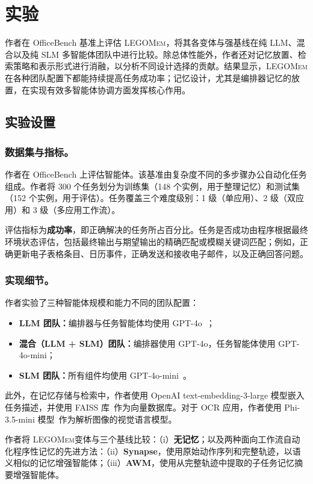 \documentclass[10pt,twocolumn]{article}
\newcommand{\legomem}{\textsc{LEGOMem}}
\begin{document}
\section{实验}

作者在 OfficeBench 基准上评估 \legomem，将其各变体与强基线在纯 LLM、混合以及纯 SLM 多智能体团队中进行比较。除总体性能外，作者还对记忆放置、检索策略和表示形式进行消融，以分析不同设计选择的贡献。结果显示，\legomem 在各种团队配置下都能持续提高任务成功率；记忆设计，尤其是编排器记忆的放置，在实现有效多智能体协调方面发挥核心作用。

\subsection{实验设置}

\subsubsection{数据集与指标。}
作者在 OfficeBench 上评估智能体。该基准由复杂度不同的多步骤办公自动化任务组成。作者将 300 个任务划分为训练集（148 个实例，用于整理记忆）和测试集（152 个实例，用于评估）。任务覆盖三个难度级别：1 级（单应用）、2 级（双应用）和 3 级（多应用工作流）。

评估指标为\textbf{成功率}，即正确解决的任务所占百分比。任务是否成功由程序根据最终环境状态评估，包括最终输出与期望输出的精确匹配或模糊关键词匹配；例如，正确更新电子表格条目、日历事件，正确发送和接收电子邮件，以及正确回答问题。

\subsubsection{实现细节。}
作者实验了三种智能体规模和能力不同的团队配置：
\begin{itemize}
    \item \textbf{LLM 团队：}编排器与任务智能体均使用 GPT-4o~\cite{hurst2024gpt}；
    \item \textbf{混合（LLM + SLM）团队：}编排器使用 GPT-4o，任务智能体使用 GPT-4o-mini；
    \item \textbf{SLM 团队：}所有组件均使用 GPT-4o-mini~\cite{hurst2024gpt}。
\end{itemize}
此外，在记忆存储与检索中，作者使用 OpenAI text-embedding-3-large 模型嵌入任务描述，并使用 FAISS 库~\cite{douze2024faiss}作为向量数据库。对于 OCR 应用，作者使用 Phi-3.5-mini 模型~\cite{abdin2024phi}作为解析图像的视觉语言模型。

作者将 \legomem 变体与三个基线比较：（i）\textbf{无记忆}；以及两种面向工作流自动化程序性记忆的先进方法：（ii）\textbf{Synapse}，使用原始动作序列和完整轨迹，以语义相似的记忆增强智能体；（iii）\textbf{AWM}，使用从完整轨迹中提取的子任务记忆摘要增强智能体。
\end{document}
